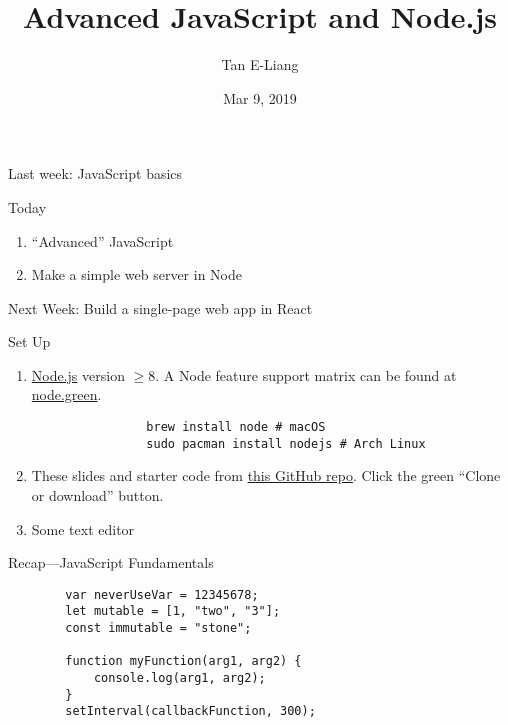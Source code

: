 \documentclass{beamer}
\title{Advanced JavaScript and Node.js}
\author{Tan E-Liang}
\institute{Hackerschool}
\date{Mar 9, 2019}
\begin{document}
\maketitle

\begin{frame}[fragile]
    Last week: JavaScript basics

    Today
    \begin{enumerate}
        \item ``Advanced'' JavaScript
        \item Make a simple web server in Node
    \end{enumerate}

    Next Week: Build a single-page web app in React
\end{frame}

\begin{frame}[fragile]{Set Up}
    \begin{enumerate}
        \item
            \href{https://nodejs.org/en/download/}{Node.js} version $\geq8$. A Node feature support matrix can be found at \href{https://node.green/}{node.green}.
            \begin{verbatim}
                brew install node # macOS
                sudo pacman install nodejs # Arch Linux
            \end{verbatim}
        \item These slides and starter code from \href{https://github.com/taneliang/hackerschool-advanced-js-node}{this GitHub repo}. Click the green ``Clone or download'' button.
        \item Some text editor
    \end{enumerate}
\end{frame}

\begin{frame}[fragile]{Recap---JavaScript Fundamentals}
    \begin{verbatim}
        var neverUseVar = 12345678;
        let mutable = [1, "two", "3"];
        const immutable = "stone";

        function myFunction(arg1, arg2) {
            console.log(arg1, arg2);
        }
        setInterval(callbackFunction, 300);
    \end{verbatim}
\end{frame}
\end{document}
